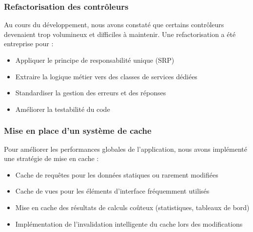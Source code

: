 \subsubsection{Refactorisation des contrôleurs}
Au cours du développement, nous avons constaté que certains contrôleurs devenaient trop volumineux et difficiles à maintenir. Une refactorisation a été entreprise pour :

\begin{itemize}
    \item Appliquer le principe de responsabilité unique (SRP)
    \item Extraire la logique métier vers des classes de services dédiées
    \item Standardiser la gestion des erreurs et des réponses
    \item Améliorer la testabilité du code
\end{itemize}

\subsubsection{Mise en place d'un système de cache}
Pour améliorer les performances globales de l'application, nous avons implémenté une stratégie de mise en cache :

\begin{itemize}
    \item Cache de requêtes pour les données statiques ou rarement modifiées
    \item Cache de vues pour les éléments d'interface fréquemment utilisés
    \item Mise en cache des résultats de calculs coûteux (statistiques, tableaux de bord)
    \item Implémentation de l'invalidation intelligente du cache lors des modifications
\end{itemize}
